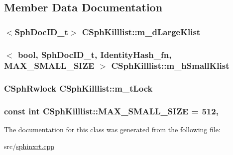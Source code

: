 \subsection{Member Data Documentation}
\hypertarget{classCSphKilllist_aa8e0fcba4bd5f62efe486f8106f80ec9}{
\subsubsection[{m\-\_\-d\-Large\-Klist}]{$<${\bf Sph\-Doc\-I\-D\-\_\-t}$>$ C\-Sph\-Killlist\-::m\-\_\-d\-Large\-Klist\hspace{0.3cm}{\ttfamily [private]}}}\label{classCSphKilllist_aa8e0fcba4bd5f62efe486f8106f80ec9}
\hypertarget{classCSphKilllist_ae3de84a11c91101fd41bb66ca913d34a}{
\subsubsection[{m\-\_\-h\-Small\-Klist}]{$<$ bool, {\bf Sph\-Doc\-I\-D\-\_\-t}, {\bf Identity\-Hash\-\_\-fn}, {\bf M\-A\-X\-\_\-\-S\-M\-A\-L\-L\-\_\-\-S\-I\-Z\-E} $>$ C\-Sph\-Killlist\-::m\-\_\-h\-Small\-Klist\hspace{0.3cm}{\ttfamily [private]}}}\label{classCSphKilllist_ae3de84a11c91101fd41bb66ca913d34a}
\hypertarget{classCSphKilllist_a44684cc99c018e1365eec9b070d42731}{
\subsubsection[{m\-\_\-t\-Lock}]{\setlength{\rightskip}{0pt plus 5cm}C\-Sph\-Rwlock C\-Sph\-Killlist\-::m\-\_\-t\-Lock\hspace{0.3cm}{\ttfamily [private]}}}\label{classCSphKilllist_a44684cc99c018e1365eec9b070d42731}
\hypertarget{classCSphKilllist_a8ff68f7e3cf4fd9b7d78647315babf45}{
\subsubsection[{M\-A\-X\-\_\-\-S\-M\-A\-L\-L\-\_\-\-S\-I\-Z\-E}]{\setlength{\rightskip}{0pt plus 5cm}const {\bf int} C\-Sph\-Killlist\-::\-M\-A\-X\-\_\-\-S\-M\-A\-L\-L\-\_\-\-S\-I\-Z\-E = 512\hspace{0.3cm}{\ttfamily [static]}, {\ttfamily [private]}}}\label{classCSphKilllist_a8ff68f7e3cf4fd9b7d78647315babf45}


The documentation for this class was generated from the following file\-:\begin{DoxyCompactItemize}
\item 
src/\hyperlink{sphinxrt_8cpp}{sphinxrt.\-cpp}\end{DoxyCompactItemize}
